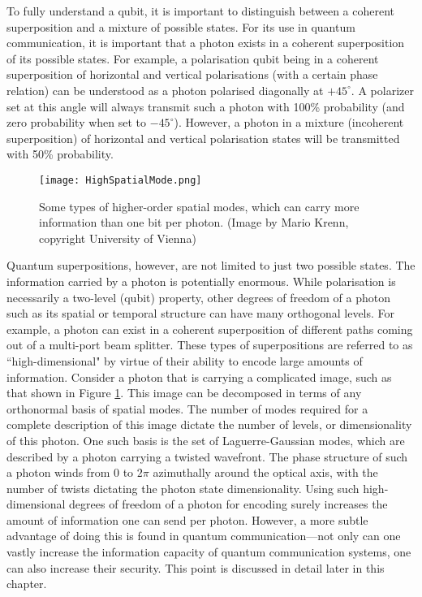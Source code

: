 \documentclass{article}
\begin{document}
To fully understand a qubit, it is important to distinguish between a coherent superposition and a mixture of possible states. For its use in quantum communication, it is important that a photon exists in a coherent superposition of its possible states. 
For example, a polarisation qubit being in a coherent superposition of horizontal and vertical polarisations (with a certain phase relation) can be understood as a photon polarised diagonally at $+45^\circ$. A polarizer set at this angle will always transmit such a photon with 100\% probability (and zero probability when set to $-45^\circ$). However, a photon in a mixture (incoherent superposition) of horizontal and vertical polarisation states will be transmitted with 50\% probability.
\begin{figure}[h!]
\centering
\texttt{[image: HighSpatialMode.png]}
\caption{Some types of higher-order spatial modes, which can carry more information than one bit per photon. (Image by Mario Krenn, copyright University of Vienna)}
\label{fig:HigherModes}
\end{figure}
Quantum superpositions, however, are not limited to just two possible states. The information carried by a photon is potentially enormous. While polarisation is necessarily a two-level (qubit) property, other degrees of freedom of a photon such as its spatial or temporal structure can have many orthogonal levels. For example, a photon can exist in a coherent superposition of different paths coming out of a multi-port beam splitter. These types of superpositions are referred to as ``high-dimensional" by virtue of their ability to encode large amounts of information. Consider a photon that is carrying a complicated image, such as that shown in Figure \ref{fig:HigherModes}. This image can be decomposed in terms of any orthonormal basis of spatial modes. The number of modes required for a complete description of this image dictate the number of levels, or dimensionality of this photon. One such basis is the set of Laguerre-Gaussian modes, which are described by a photon carrying a twisted wavefront. The phase structure of such a photon winds from 0 to $2\pi$ azimuthally around the optical axis, with the number of twists dictating the photon state dimensionality. Using such high-dimensional degrees of freedom of a photon for encoding surely increases the amount of information one can send per photon. However, a more subtle advantage of doing this is found in quantum communication---not only can one vastly increase the information capacity of quantum communication systems, one can also increase their security. This point is discussed in detail later in this chapter.\\
\end{document}

